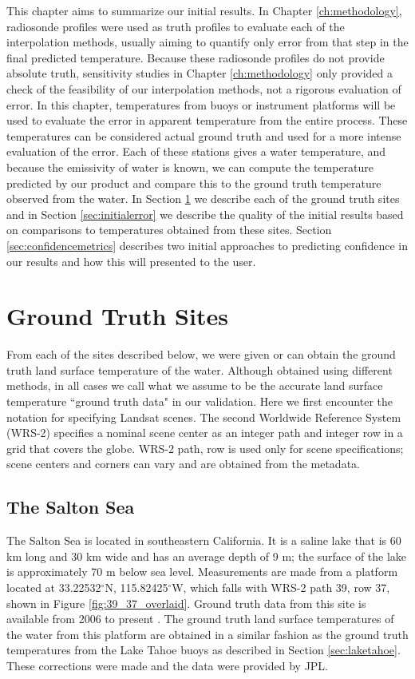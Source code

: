 \documentclass{book}
\begin{document}
This chapter aims to summarize our initial results.  In Chapter \ref{ch:methodology}, radiosonde profiles were used as truth profiles to evaluate each of the interpolation methods, usually aiming to quantify only error from that step in the final predicted temperature.  Because these radiosonde profiles do not provide absolute truth, sensitivity studies in Chapter \ref{ch:methodology} only provided a check of the feasibility of our interpolation methods, not a rigorous evaluation of error.  In this chapter, temperatures from buoys or instrument platforms will be used to evaluate the error in apparent temperature from the entire process.  These temperatures can be considered actual ground truth and used for a more intense evaluation of the error.  Each of these stations gives a water temperature, and because the emissivity of water is known, we can compute the temperature predicted by our product and compare this to the ground truth temperature observed from the water.  In Section \ref{sec:groundtruthsites} we describe each of the ground truth sites and in Section \ref{sec:initialerror} we describe the quality of the initial results based on comparisons to temperatures obtained from these sites.  Section \ref{sec:confidencemetrics} describes two initial approaches to predicting confidence in our results and how this will presented to the user.

\section{Ground Truth Sites}
\label{sec:groundtruthsites}

From each of the sites described below, we were given or can obtain the ground truth land surface temperature of the water.  Although obtained using different methods, in all cases we call what we assume to be the accurate land surface temperature ``ground truth data" in our validation.  Here we first encounter the notation for specifying Landsat scenes.  The second Worldwide Reference System (WRS-2) specifies a nominal scene center as an integer path and integer row in a grid that covers the globe.  WRS-2 path, row is used only for scene specifications; scene centers and corners can vary and are obtained from the metadata.  

\subsection{The Salton Sea}
\label{sec:saltonsea}

The Salton Sea is located in southeastern California.  It is a saline lake that is 60 km long and 30 km wide and has an average depth of 9 m; the surface of the lake is approximately 70 m below sea level.  Measurements are made from a platform located at 33.22532$^\circ$N, 115.82425$^\circ$W, which falls with WRS-2 path 39, row 37, shown in Figure \ref{fig:39_37_overlaid}.  Ground truth data from this site is available from 2006 to present \cite{hook_salton}.  The ground truth land surface temperatures of the water from this platform are obtained in a similar fashion as the ground truth temperatures from the Lake Tahoe buoys as described in Section \ref{sec:laketahoe}.  These corrections were made and the data were provided by JPL.
\end{document}

